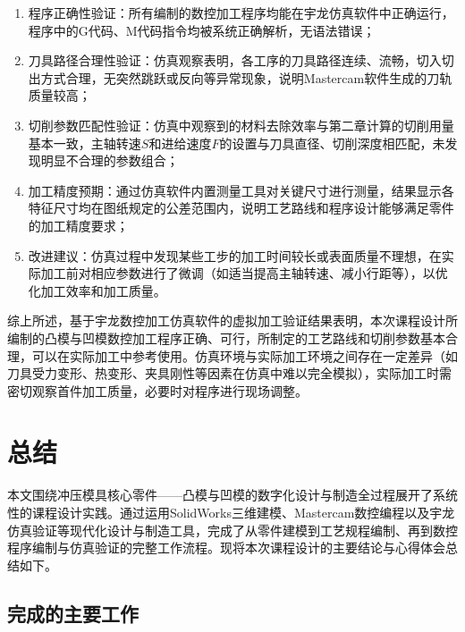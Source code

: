 \documentclass{xautCADreport}
\begin{document}
\begin{enumerate}
  \item 程序正确性验证：所有编制的数控加工程序均能在宇龙仿真软件中正确运行，程序中的G代码、M代码指令均被系统正确解析，无语法错误；
  \item 刀具路径合理性验证：仿真观察表明，各工序的刀具路径连续、流畅，切入切出方式合理，无突然跳跃或反向等异常现象，说明Mastercam软件生成的刀轨质量较高；
  \item 切削参数匹配性验证：仿真中观察到的材料去除效率与第二章计算的切削用量基本一致，主轴转速$S$和进给速度$F$的设置与刀具直径、切削深度相匹配，未发现明显不合理的参数组合；
  \item 加工精度预期：通过仿真软件内置测量工具对关键尺寸进行测量，结果显示各特征尺寸均在图纸规定的公差范围内，说明工艺路线和程序设计能够满足零件的加工精度要求；
  \item 改进建议：仿真过程中发现某些工步的加工时间较长或表面质量不理想，在实际加工前对相应参数进行了微调（如适当提高主轴转速、减小行距等），以优化加工效率和加工质量。
\end{enumerate}

综上所述，基于宇龙数控加工仿真软件的虚拟加工验证结果表明，本次课程设计所编制的凸模与凹模数控加工程序正确、可行，所制定的工艺路线和切削参数基本合理，可以在实际加工中参考使用。仿真环境与实际加工环境之间存在一定差异（如刀具受力变形、热变形、夹具刚性等因素在仿真中难以完全模拟），实际加工时需密切观察首件加工质量，必要时对程序进行现场调整。




\newpage

\section{总结}

本文围绕冲压模具核心零件——凸模与凹模的数字化设计与制造全过程展开了系统性的课程设计实践。通过运用SolidWorks三维建模、Mastercam数控编程以及宇龙仿真验证等现代化设计与制造工具，完成了从零件建模到工艺规程编制、再到数控程序编制与仿真验证的完整工作流程。现将本次课程设计的主要结论与心得体会总结如下。

\subsection{完成的主要工作}
\end{document}
